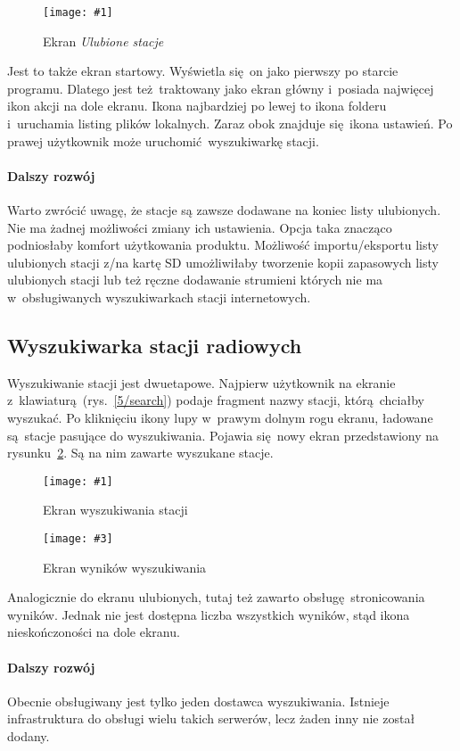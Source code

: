 \documentclass[polish]{aghengthesis}
\newcommand{\imgint}[4]{
	\begin{figure}[{#4}]
		\centering
		\texttt{[image: \#1]}
		\caption{#2}
		\label{#1}
	\end{figure}
}
\newcommand{\imgh}[3]{\imgint{#1}{#2}{#3}{H}}
\newcommand{\imgintss}[5]{
	\begin{figure}[{#5}]
		\centering
		\begin{minipage}{.45\textwidth}
			\centering
			\texttt{[image: \#1]}
			\caption{#2}
			\label{#1}
		\end{minipage}%
		\hfill
		\begin{minipage}{.45\textwidth}
			\centering
			\texttt{[image: \#3]}
			\caption{#4}
			\label{#3}
		\end{minipage}
	\end{figure}
}
\newcommand{\imghss}[4]{\imgintss{#1}{#2}{#3}{#4}{H}}
\begin{document}
			\imgh{5/fav}{Ekran \textit{Ulubione stacje}}{0.5}
			
			Jest to także ekran startowy. Wyświetla się on jako pierwszy po starcie programu. Dlatego jest też traktowany jako ekran główny i~posiada najwięcej ikon akcji na dole ekranu.
			Ikona najbardziej po lewej to ikona folderu i~uruchamia listing plików lokalnych. Zaraz obok znajduje się ikona ustawień. Po prawej użytkownik może uruchomić wyszukiwarkę stacji.
			
			\paragraph{Dalszy rozwój}
				Warto zwrócić uwagę, że stacje są zawsze dodawane na koniec listy ulubionych. Nie ma żadnej możliwości zmiany ich ustawienia. Opcja taka znacząco podniosłaby komfort użytkowania produktu. Możliwość importu/eksportu listy ulubionych stacji z/na kartę SD umożliwiłaby tworzenie kopii zapasowych listy ulubionych stacji lub też ręczne dodawanie strumieni których nie ma w~obsługiwanych wyszukiwarkach stacji internetowych.
			
		\subsection{Wyszukiwarka stacji radiowych}
			Wyszukiwanie stacji jest dwuetapowe. Najpierw użytkownik na ekranie z~klawiaturą (rys.~\ref{5/search}) podaje fragment nazwy stacji, którą chciałby wyszukać. Po kliknięciu ikony lupy w~prawym dolnym rogu ekranu, ładowane są stacje pasujące do wyszukiwania. Pojawia się nowy ekran przedstawiony na rysunku~\ref{5/searchres}. Są na nim zawarte wyszukane stacje.
			
			\imghss{5/search}{Ekran wyszukiwania stacji}{5/searchres}{Ekran wyników wyszukiwania}
			
			Analogicznie do ekranu ulubionych, tutaj też zawarto obsługę stronicowania wyników. Jednak nie jest dostępna liczba wszystkich wyników, stąd ikona nieskończoności na dole ekranu.
			
			\paragraph{Dalszy rozwój}
				Obecnie obsługiwany jest tylko jeden dostawca wyszukiwania. Istnieje infrastruktura do obsługi wielu takich serwerów, lecz żaden inny nie został dodany.
			
\end{document}
